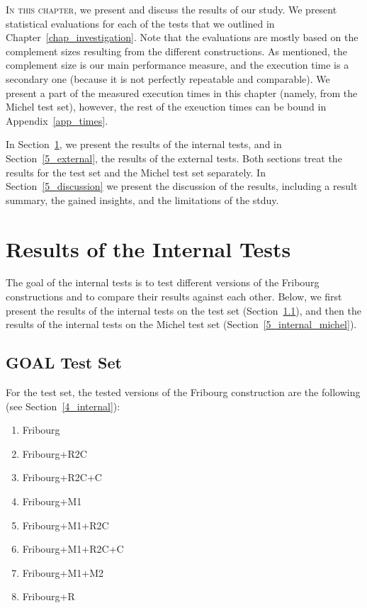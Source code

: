 \lettrine{I}{n this chapter}, we present and discuss the results of our study. We present statistical evaluations for each of the tests that we outlined in Chapter~\ref{chap_investigation}. Note that the evaluations are mostly based on the complement sizes resulting from the different constructions. As mentioned, the complement size is our main performance measure, and the execution time is a secondary one (because it is not perfectly repeatable and comparable). We present a part of the measured execution times in this chapter (namely, from the Michel test set), however, the rest of the exeuction times can be bound in Appendix~\ref{app_times}.

In Section~\ref{5_internal}, we present the results of the internal tests, and in Section~\ref{5_external}, the results of the external tests. Both sections treat the results for the \goal{} test set and the Michel test set separately. In Section~\ref{5_discussion} we present the discussion of the results, including a result summary, the gained insights, and the limitations of the stduy.


\section{Results of the Internal Tests}
\label{5_internal}
The goal of the internal tests is to test different versions of the Fribourg constructions and to compare their results against each other. Below, we first present the results of the internal tests on the \goal{} test set (Section~\ref{5_internal_goal}), and then the results of the internal tests on the Michel test set (Section~\ref{5_internal_michel}).

\subsection{GOAL Test Set}
\label{5_internal_goal}
For the \goal{} test set, the tested versions of the Fribourg construction are the following (see Section~\ref{4_internal}):

\begin{enumerate}
\item Fribourg
\item Fribourg+R2C
\item Fribourg+R2C+C
\item Fribourg+M1
\item Fribourg+M1+R2C
\item Fribourg+M1+R2C+C
\item Fribourg+M1+M2
\item Fribourg+R
\end{enumerate}

